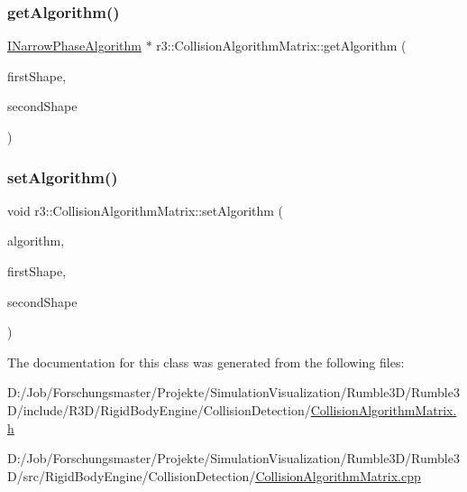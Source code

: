 \subsubsection{\texorpdfstring{get\+Algorithm()}{getAlgorithm()}}
{\footnotesize\ttfamily \mbox{\hyperlink{classr3_1_1_i_narrow_phase_algorithm}{I\+Narrow\+Phase\+Algorithm}} $\ast$ r3\+::\+Collision\+Algorithm\+Matrix\+::get\+Algorithm (\begin{DoxyParamCaption}\item[{Collision\+Primitive\+Type}]{first\+Shape,  }\item[{Collision\+Primitive\+Type}]{second\+Shape }\end{DoxyParamCaption})}

\mbox{\label{classr3_1_1_collision_algorithm_matrix_a6ddf117fbce8a3216b4b4413ccade6d0}} 
\subsubsection{\texorpdfstring{set\+Algorithm()}{setAlgorithm()}}
{\footnotesize\ttfamily void r3\+::\+Collision\+Algorithm\+Matrix\+::set\+Algorithm (\begin{DoxyParamCaption}\item[{\mbox{\hyperlink{classr3_1_1_i_narrow_phase_algorithm}{I\+Narrow\+Phase\+Algorithm}} $\ast$}]{algorithm,  }\item[{Collision\+Primitive\+Type}]{first\+Shape,  }\item[{Collision\+Primitive\+Type}]{second\+Shape }\end{DoxyParamCaption})}



The documentation for this class was generated from the following files\+:\begin{DoxyCompactItemize}
\item 
D\+:/\+Job/\+Forschungsmaster/\+Projekte/\+Simulation\+Visualization/\+Rumble3\+D/\+Rumble3\+D/include/\+R3\+D/\+Rigid\+Body\+Engine/\+Collision\+Detection/\mbox{\hyperlink{_collision_algorithm_matrix_8h}{Collision\+Algorithm\+Matrix.\+h}}\item 
D\+:/\+Job/\+Forschungsmaster/\+Projekte/\+Simulation\+Visualization/\+Rumble3\+D/\+Rumble3\+D/src/\+Rigid\+Body\+Engine/\+Collision\+Detection/\mbox{\hyperlink{_collision_algorithm_matrix_8cpp}{Collision\+Algorithm\+Matrix.\+cpp}}\end{DoxyCompactItemize}
